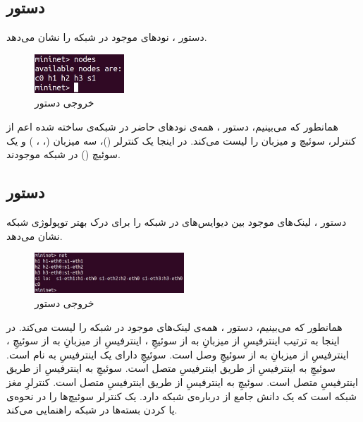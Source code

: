 \documentclass{article}
\begin{document}
\subsection{دستور }
دستور ، نودهای موجود در شبکه را نشان می‌دهد.
\begin{figure}[H]
    \centering
    \includegraphics[width=0.3\textwidth]{figures/2b.jpg}
    \caption
	{
خروجی دستور 
	}
    \label{fig:fig1}
\end{figure}
همانطور که می‌بینیم، دستور ، همه‌ی نودهای حاضر در شبکه‌ی ساخته شده اعم از کنترلر، سوئیچ و میزبان را لیست می‌کند. در اینجا یک کنترلر ()، سه میزبان (، ، ) و یک سوئیچ () در شبکه موجودند.

\subsection{دستور }
دستور ، لینک‌های موجود بین دیوایس‌های  در شبکه را برای درک بهتر توپولوژی شبکه نشان می‌دهد.
\begin{figure}[H]
    \centering
    \includegraphics[width=0.5\textwidth]{figures/2c.jpg}
    \caption
	{
خروجی دستور 
	}
    \label{fig:fig1}
\end{figure}
همانطور که می‌بینیم، دستور ، همه‌ی لینک‌های موجود در شبکه را لیست می‌کند.
در اینجا به ترتیب اینترفیسِ  از میزبانِ  به  از سوئیچِ ، اینترفیسِ  از میزبانِ  به  از سوئیچِ ، اینترفیسِ  از میزبانِ  به  از سوئیچِ  وصل است.
سوئیچِ  دارای یک اینترفیسِ  به نام  است.
سوئیچِ  به اینترفیسِ  از طریق اینترفیسِ  متصل است.
سوئیچِ  به اینترفیسِ  از طریق اینترفیسِ  متصل است.
سوئیچِ  به اینترفیسِ  از طریق اینترفیسِ  متصل است.
کنترلرِ  مغز شبکه است که یک دانش جامع از درباره‌ی شبکه دارد. یک کنترلر سوئیچ‌ها را در نحوه‌ی  یا  کردن بسته‌ها در شبکه راهنمایی می‌کند.
\end{document}
